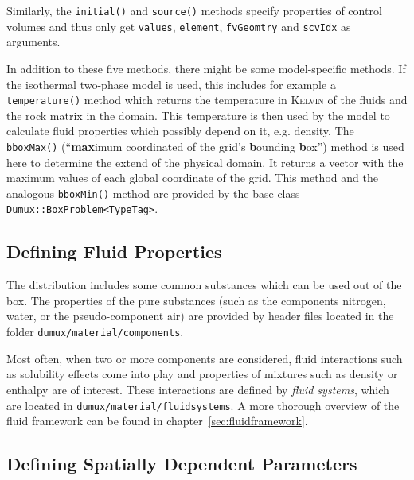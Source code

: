 Similarly, the \texttt{initial()} and \texttt{source()} methods
specify properties of control volumes and thus only get
\texttt{values}, \texttt{element}, \texttt{fvGeomtry} and
\texttt{scvIdx} as arguments.

In addition to these five methods, there might be some model-specific
methods. If the isothermal two-phase model is used, this includes for
example a \texttt{temperature()} method which returns the temperature
in \textsc{Kelvin} of the fluids and the rock matrix in the
domain. This temperature is then used by the model to calculate fluid
properties which possibly depend on it, e.g. density. The
\texttt{bboxMax()} (``\textbf{max}imum coordinated of the grid's
\textbf{b}ounding \textbf{b}ox'') method is used here to
determine the extend of the physical domain. It returns a vector with the
maximum values of each global coordinate of the grid. This method
and the analogous \texttt{bboxMin()} method are provided by the base
class \texttt{Dumux::BoxProblem<TypeTag>}.

\subsection{Defining Fluid Properties}\label{tutorial-coupled:description-fluid-class}

The \Dumux distribution includes some common substances which can be
used out of the box. The properties of the pure substances (such as
the components nitrogen, water, or the pseudo-component air) are
provided by header files located in the folder
\verb+dumux/material/components+.

Most often, when two or more components are considered, fluid
interactions such as solubility effects come into play and properties
of mixtures such as density or enthalpy are of interest. These
interactions are defined by {\em fluid systems}, which are located in
\verb+dumux/material/fluidsystems+. A more thorough overview of the
\Dumux fluid framework can be found in chapter~\ref{sec:fluidframework}.


\subsection{Defining Spatially Dependent Parameters}\label{tutorial-coupled:description-spatialParameters}

